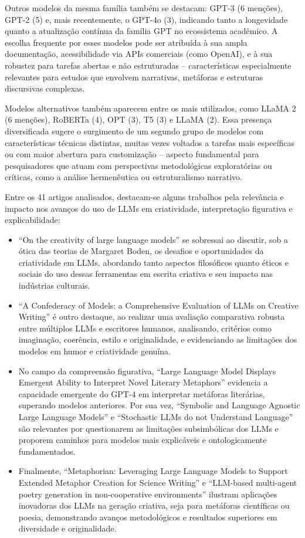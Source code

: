 \documentclass[portuguese]{textolivre}
\begin{document}
Outros modelos da mesma família também se destacam: GPT-3 (6 menções), GPT-2 (5) e, mais recentemente, o GPT-4o (3), indicando tanto a longevidade quanto a atualização contínua da família GPT no ecossistema acadêmico. A escolha frequente por esses modelos pode ser atribuída à sua ampla documentação, acessibilidade via APIs comerciais (como OpenAI), e à sua robustez para tarefas abertas e não estruturadas -- características especialmente relevantes para estudos que envolvem narrativas, metáforas e estruturas discursivas complexas.

Modelos alternativos também aparecem entre os mais utilizados, como LLaMA 2 (6 menções), RoBERTa (4), OPT (3), T5 (3) e LLaMA (2). Essa presença diversificada sugere o surgimento de um segundo grupo de modelos com características técnicas distintas, muitas vezes voltados a tarefas mais específicas ou com maior abertura para customização -- aspecto fundamental para pesquisadores que atuam com perspectivas metodológicas exploratórias ou críticas, como a análise hermenêutica ou estruturalismo narrativo.

Entre os 41 artigos analisados, destacam-se alguns trabalhos pela relevância e impacto nos avanços do uso de LLMs em criatividade, interpretação figurativa e explicabilidade:

\begin{itemize}
    \item ``On the creativity of large language models'' \cite{franceschelli2024} se sobressai ao discutir, sob a ótica das teorias de Margaret Boden, os desafios e oportunidades da criatividade em LLMs, abordando tanto aspectos filosóficos quanto éticos e sociais do uso dessas ferramentas em escrita criativa e seu impacto nas indústrias culturais.
    \item ``A Confederacy of Models: a Comprehensive Evaluation of LLMs on Creative Writing'' \cite{gomez-rodriguez2023} é outro destaque, ao realizar uma avaliação comparativa robusta entre múltiplos LLMs e escritores humanos, analisando, critérios como imaginação, coerência, estilo e originalidade, e evidenciando as limitações dos modelos em humor e criatividade genuína.
    \item No campo da compreensão figurativa, ``Large Language Model Displays Emergent Ability to Interpret Novel Literary Metaphors'' \cite{ichien2023} evidencia a capacidade emergente do GPT-4 em interpretar metáforas literárias, superando modelos anteriores. Por sua vez, ``Symbolic and Language Agnostic Large Language Models'' \cite{saba2023a} e ``Stochastic LLMs do not Understand Language'' \cite{saba2023b} são relevantes por questionarem as limitações subsimbólicas dos LLMs e proporem caminhos para modelos mais explicáveis e ontologicamente fundamentados.
    \item Finalmente, ``Metaphorian: Leveraging Large Language Models to Support Extended Metaphor Creation for Science Writing'' \cite{kim2023} e ``LLM-based multi-agent poetry generation in non-cooperative environments'' \cite{zhang2024} ilustram aplicações inovadoras dos LLMs na geração criativa, seja para metáforas científicas ou poesia, demonstrando avanços metodológicos e resultados superiores em diversidade e originalidade.
\end{itemize}
\end{document}
